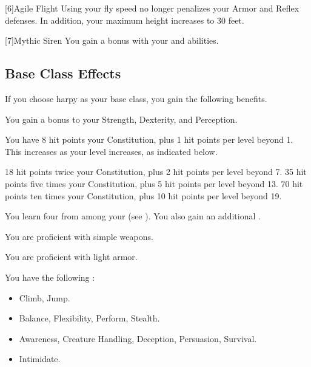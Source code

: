     [6]{Agile Flight} Using your fly speed no longer penalizes your Armor and Reflex defenses.
      In addition, your maximum height increases to 30 feet.

      [7]{Mythic Siren} You gain a   bonus with your  and  abilities.

  \subsection{Base Class Effects}
    If you choose harpy as your base class, you gain the following benefits.

     You gain a  bonus to your Strength, Dexterity, and Perception.

      You have 8 hit points \add  your Constitution, plus 1 hit points per level beyond 1.
      This increases as your level increases, as indicated below.
      \begin{itemize}
         18 hit points \add twice your Constitution, plus 2 hit points per level beyond 7.
         35 hit points \add five times your Constitution, plus 5 hit points per level beyond 13.
         70 hit points \add ten times your Constitution, plus 10 hit points per level beyond 19.
      \end{itemize}

      You learn four  from among your  (see ). You also gain an additional .

      You are proficient with simple weapons.

      You are proficient with light armor.

      You have the following :
      \begin{itemize}
        \item {} Climb, Jump.
        \item {} Balance, Flexibility, Perform, Stealth.
        \item {} Awareness, Creature Handling, Deception, Persuasion, Survival.
        \item {} Intimidate.
      \end{itemize}

